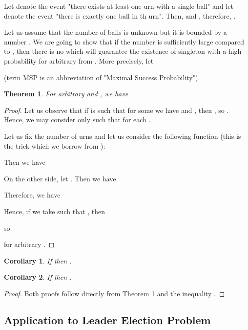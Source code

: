 \documentclass[proceedings]{dmtcs}
\newtheorem{theorem}{Theorem}
\newtheorem{corollary}{Corollary}
\begin{document}
Let   denote the event "there exists at least one urn with a single ball"
and let  denote the event "there is exactly one ball in th urn". Then, 
 and ,
therefore,
.

Let us assume that the number  of balls is unknown but it is bounded by a number .
We are going to show that if the number  is sufficiently large compared to , then
there is no  which will guarantee the existence of singleton with a high probability 
for arbitrary  from .
More precisely, let

(term MSP is an abbreviation of "Maximal Success Probability").
 
\begin{theorem}
\label{thm:main}
For arbitrary  and , we have

\end{theorem}

\begin{proof}
Let us observe that if  is such that for some  we have  and , then
, so  . Hence, we may consider only
such  that  for each .
 
Let us fix  the number  of urns and let us consider the following function (this is the trick which we borrow from
\cite{Willard:1986}):

Then we have

On the other side, let . Then we have


Therefore, we have

Hence, if we take  such that , then

so 

for arbitrary .  
\end{proof}


\begin{corollary}
\label{cor:bound01}
If  then   .
\end{corollary}

\begin{corollary}
\label{cor:bound02}
If   then   .
\end{corollary}

\begin{proof}
Both proofs follow directly from Theorem \ref{thm:main} and the inequality . 
\end{proof}

\subsection{Application to Leader Election Problem}
\end{document}
